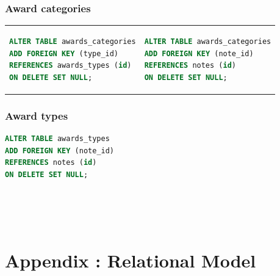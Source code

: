 \documentclass[doubleside, titlepage]{article}
\begin{document}
\subsubsection{Award categories}

\begin{tabular}{ ll }
\begin{minipage}{3in}
\begin{lstlisting}[language=SQL,showspaces=false,basicstyle=\ttfamily,numberstyle=\tiny,commentstyle=\color{gray}
        ]
ALTER TABLE awards_categories
ADD FOREIGN KEY (type_id)
REFERENCES awards_types (id)
ON DELETE SET NULL;
\end{lstlisting}
\end{minipage}
 &
\begin{minipage}{3in}
\begin{lstlisting}[language=SQL,showspaces=false,basicstyle=\ttfamily,numberstyle=\tiny,commentstyle=\color{gray}
        ]
ALTER TABLE awards_categories
ADD FOREIGN KEY (note_id)
REFERENCES notes (id)
ON DELETE SET NULL;
\end{lstlisting}
\end{minipage}
\end{tabular}

\subsubsection{Award types}
\begin{lstlisting}[language=SQL,showspaces=false,basicstyle=\ttfamily,numberstyle=\tiny,commentstyle=\color{gray}
        ]
ALTER TABLE awards_types
ADD FOREIGN KEY (note_id)
REFERENCES notes (id)
ON DELETE SET NULL;
\end{lstlisting}

~\\
~\\
~\\

\section{Appendix : Relational Model}

\newpage
\end{document}
